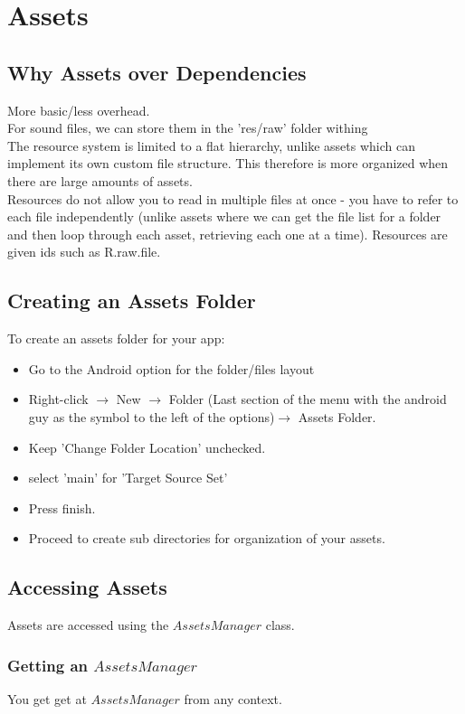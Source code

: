 \documentclass[]{article}
\begin{document}
\section{Assets}
\subsection{Why Assets over Dependencies}
More basic/less overhead.
\\
For sound files, we can store them in the 'res/raw' folder withing 
\\
The resource system is limited to a flat hierarchy, unlike assets which can implement its own custom file structure.  This therefore is more organized when there are large amounts of assets.
\\
Resources do not allow you to read in multiple files at once - you have to refer to each file independently (unlike assets where we can get the file list for a folder and then  loop through each asset, retrieving each one at a time).  Resources are given ids such as R.raw.file.


\subsection{Creating an Assets Folder}
To create an assets folder for your app:
\begin{itemize}
	\item Go to the Android option for the folder/files layout 
	\item Right-click $\rightarrow$ New $\rightarrow$ Folder (Last section of the menu with the android guy as the symbol to the left of the options)$\rightarrow$ Assets Folder.
	\item Keep 'Change Folder Location' unchecked.
	\item select 'main' for 'Target Source Set'
	\item Press finish.
	\item Proceed to create sub directories for organization of your assets.
\end{itemize}

\subsection{Accessing Assets}
Assets are accessed using the $AssetsManager$ class.
\subsubsection{Getting an $AssetsManager$}
You get get at $AssetsManager$ from any context.
\end{document}
